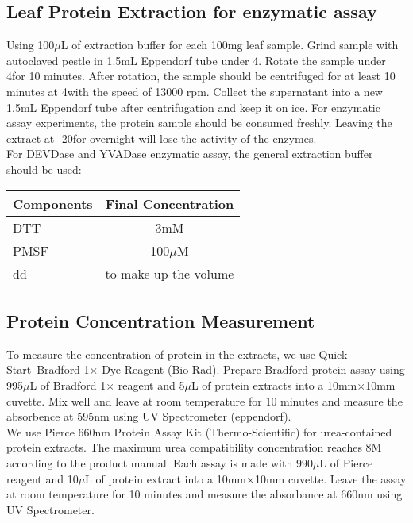 \subsection{Leaf Protein Extraction for enzymatic assay}
Using 100$\mu$L of extraction buffer for each 100mg leaf sample. Grind sample with autoclaved pestle in 1.5mL Eppendorf tube under 4\textcelsius. Rotate the sample under 4\textcelsius for 10 minutes. After rotation, the sample should be centrifuged for at least 10 minutes at 4\textcelsius with the speed of 13000 rpm. Collect the supernatant into a new 1.5mL Eppendorf tube after centrifugation and keep it on ice. For enzymatic assay experiments, the protein sample should be consumed freshly. Leaving the extract at -20\textcelsius for overnight will lose the activity of the enzymes.\\
For DEVDase and YVADase enzymatic assay, the general extraction buffer should be used:\\

\begin{tabular}[h]{l c}
	\hline
	\textbf{\textsf{Components}} & \textbf{\textsf{Final Concentration}} \\
	\hline
	DTT & 3mM \\
	PMSF & 100$\mu$M \\
	dd\ce{H2O} & to make up the volume\\
	\hline
\end{tabular}
\linebreak
\linebreak

\subsection{Protein Concentration Measurement}
To measure the concentration of protein in the extracts, we use Quick Start\texttrademark~Bradford 1$\times$ Dye Reagent (Bio-Rad). Prepare Bradford protein assay using 995$\mu$L of Bradford 1$\times$ reagent and 5$\mu$L of protein extracts into a 10mm$\times$10mm cuvette. Mix well and leave at room temperature for 10 minutes and measure the absorbence at 595nm using UV Spectrometer (eppendorf).\\
We use Pierce 660nm Protein Assay Kit (Thermo-Scientific) for urea-contained protein extracts. The maximum urea compatibility concentration reaches 8M according to the product manual. Each assay is made with 990$\mu$L of Pierce reagent and 10$\mu$L of protein extract into a 10mm$\times$10mm cuvette. Leave the assay at room temperature for 10 minutes and measure the absorbance at 660nm using UV Spectrometer.
